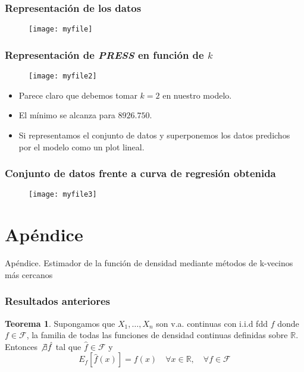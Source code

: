 \documentclass{beamer}
\theoremstyle{definition}
\newtheorem{teorema}{Teorema}
\newcommand{\R}{\mathbb{R}}
\begin{document}
\begin{frame}
\frametitle{Representación de los datos}
\begin{figure}[h!]
\texttt{[image: myfile]}
\end{figure}
\end{frame}


\begin{frame}
\frametitle{Representación de \textit{PRESS} en función de $k$}
\begin{figure}[h!]
\texttt{[image: myfile2]}
\end{figure}
\end{frame}

\begin{frame}
\begin{itemize}
\item Parece claro que debemos tomar $k=2$ en nuestro modelo.
\item El mínimo se alcanza para $8926.750$.
\item Si representamos el conjunto de datos y superponemos los datos predichos por el modelo como un plot lineal.
\end{itemize}
\end{frame}


\begin{frame}
\frametitle{Conjunto de datos frente a curva de regresión obtenida}
\begin{figure}[h!]
\texttt{[image: myfile3]}
\end{figure}
\end{frame}

\section{Apéndice}

\begin{frame}
\begin{center}
\huge{Apéndice. Estimador de la función de densidad mediante métodos de k-vecinos más cercanos}
\end{center}
\end{frame}

\begin{frame}
\frametitle{Resultados anteriores}
\begin{teorema}
Supongamos que $X_1,\dotsc,X_n$ son v.a. continuas con i.i.d fdd $f$ donde $f\in \mathcal{F}$, la familia de todas las funciones de densidad continuas definidas sobre $\R$. Entonces $\not\exists\hat{f}$ tal que $\hat{f}\in \mathcal{F}$ y 
$$
E_f[\hat{f}(x)]=f(x) \quad \forall x \in \R, \quad \forall f \in\mathcal{F}
$$
\end{teorema}
\end{frame}
\end{document}
